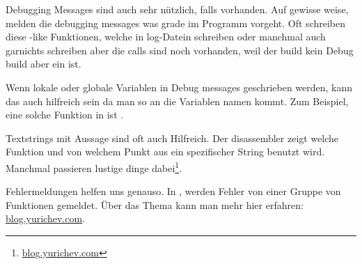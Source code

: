 Debugging Messages sind auch sehr nützlich, falls vorhanden.
Auf gewisse weise, melden die debugging messages was grade
im Programm vorgeht. Oft schreiben diese \printf-like Funktionen, welche
in log-Datein schreiben oder manchmal auch garnichts schreiben aber die 
calls sind noch vorhanden, weil der build kein Debug build aber ein  ist. %
\myindex{\oracle}


Wenn lokale oder globale Variablen in Debug messages geschrieben werden, kann das auch 
hilfreich sein da man so an die Variablen namen kommt. %
Zum Beispiel, eine solche Funktion in \oracle ist .


Textstrings mit Aussage sind oft auch Hilfreich. %
Der \IDA disassembler zeigt welche Funktion und von welchem Punkt aus ein spezifischer String benutzt wird.
Manchmal passieren lustige dinge dabei\footnote{\href{http://go.yurichev.com/17223}{blog.yurichev.com}}.


Fehlermeldungen helfen uns genauso.
In \oracle, werden Fehler von einer Gruppe von Funktionen gemeldet.
Über das Thema kann man mehr hier erfahren: \href{http://go.yurichev.com/17224}{blog.yurichev.com}.



